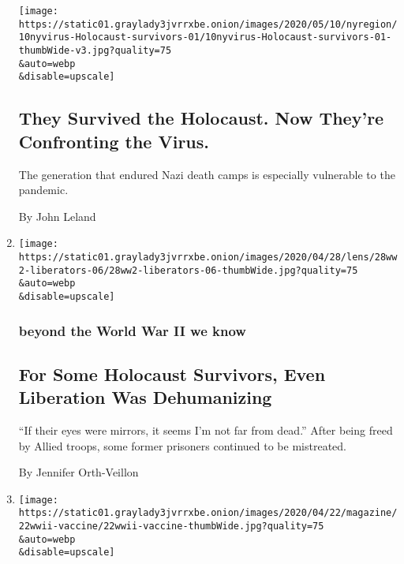 \begin{enumerate}
  \texttt{[image: https://static01.graylady3jvrrxbe.onion/images/2020/05/10/nyregion/10nyvirus-Holocaust-survivors-01/10nyvirus-Holocaust-survivors-01-thumbWide-v3.jpg?quality=75\\\&auto=webp\\\&disable=upscale]}

  \hypertarget{they-survived-the-holocaust-now-theyre-confronting-the-virus}{%
  \subsection{They Survived the Holocaust. Now They're Confronting the
  Virus.}\label{they-survived-the-holocaust-now-theyre-confronting-the-virus}}

  The generation that endured Nazi death camps is especially vulnerable
  to the pandemic.

  By John Leland
\item
  \href{/2020/04/28/magazine/for-some-holocaust-survivors-even-liberation-was-dehumanizing.html}{}

  \texttt{[image: https://static01.graylady3jvrrxbe.onion/images/2020/04/28/lens/28ww2-liberators-06/28ww2-liberators-06-thumbWide.jpg?quality=75\\\&auto=webp\\\&disable=upscale]}

  \hypertarget{beyond-the-world-war-ii-we-know-11}{%
  \subsubsection{beyond the World War II we
  know}\label{beyond-the-world-war-ii-we-know-11}}

  \hypertarget{for-some-holocaust-survivors-even-liberation-was-dehumanizing}{%
  \subsection{For Some Holocaust Survivors, Even Liberation Was
  Dehumanizing}\label{for-some-holocaust-survivors-even-liberation-was-dehumanizing}}

  ``If their eyes were mirrors, it seems I'm not far from dead.'' After
  being freed by Allied troops, some former prisoners continued to be
  mistreated.

  By Jennifer Orth-Veillon
\item
  \href{/2020/04/23/magazine/army-influenza-vaccination.html}{}

  \texttt{[image: https://static01.graylady3jvrrxbe.onion/images/2020/04/22/magazine/22wwii-vaccine/22wwii-vaccine-thumbWide.jpg?quality=75\\\&auto=webp\\\&disable=upscale]}

  \hypertarget{beyond-the-world-war-ii-we-know-12}{%
}
\end{enumerate}
